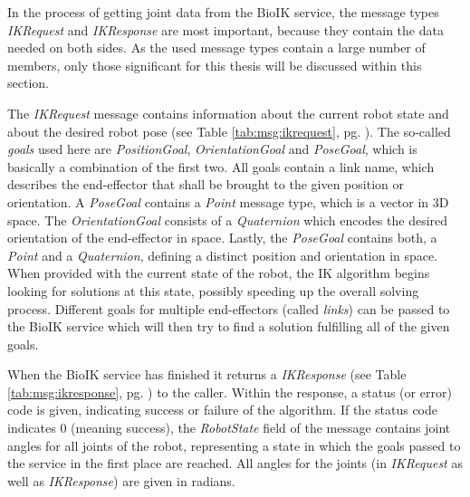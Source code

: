In the process of getting joint data from the BioIK service, the message types \textit{IKRequest} and \textit{IKResponse} are most important, because they contain the data needed on both sides. As the used message types contain a large number of members, only those significant for this thesis will be discussed within this section.

The \textit{IKRequest} message contains information about the current robot state and about the desired robot pose (see Table \ref{tab:msg:ikrequest}, pg. \pageref{tab:msg:ikrequest}). The so-called \textit{goals} used here are \textit{PositionGoal}, \textit{OrientationGoal} and \textit{PoseGoal}, which is basically a combination of the first two. All goals contain a link name, which describes the end-effector that shall be brought to the given position or orientation. A \textit{PoseGoal} contains a \textit{Point} message type, which is a vector in 3D space. The \textit{OrientationGoal} consists of a \textit{Quaternion} which encodes the desired orientation of the end-effector in space. Lastly, the \textit{PoseGoal} contains both, a \textit{Point} and a \textit{Quaternion}, defining a distinct position and orientation in space. When provided with the current state of the robot, the IK algorithm begins looking for solutions at this state, possibly speeding up the overall solving process. Different goals for multiple end-effectors (called \textit{links}) can be passed to the BioIK service which will then try to find a solution fulfilling all of the given goals.

When the BioIK service has finished it returns a \textit{IKResponse} (see Table \ref{tab:msg:ikresponse}, pg. \pageref{tab:msg:ikresponse}) to the caller. Within the response, a status (or error) code is given, indicating success or failure of the algorithm. If the status code indicates 0 (meaning success), the \textit{RobotState} field of the message contains joint angles for all joints of the robot, representing a state in which the goals passed to the service in the first place are reached. All angles for the joints (in \textit{IKRequest} as well as \textit{IKResponse}) are given in radians.

